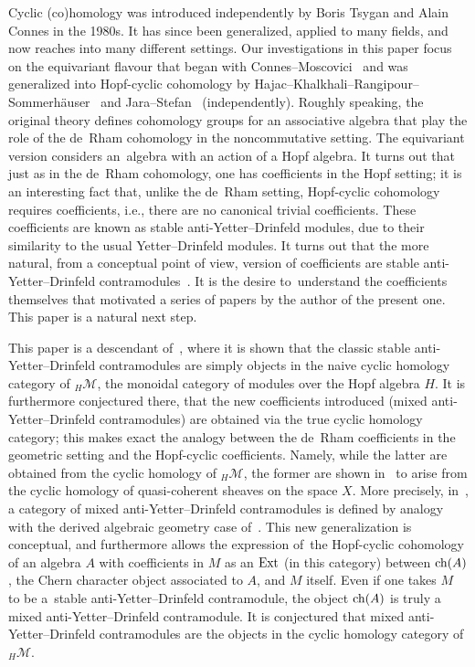 \documentclass[pdftex]{sigma}
\numberwithin{equation}{section}
\newcommand{\hmod}{{_H\mathcal{M}}}
\begin{document}
Cyclic (co)homology was introduced independently by Boris Tsygan and Alain Connes in the 1980s. It has since been generalized, applied to many fields, and now reaches into many different settings. Our investigations in this paper focus on the equivariant flavour that began with Connes--Moscovici~\cite{conmos} and was generalized into Hopf-cyclic cohomology by Hajac--Khalkhali--Rangipour--Sommerh\"{a}user~\cite{HKRS1, HKRS2} and Jara--Stefan~\cite{JS} (independently). Roughly speaking, the original theory defines cohomology groups for an associative algebra that play the role of the de~Rham cohomology in the noncommutative setting. The equivariant version considers an~alge\-bra with an action of a Hopf alge\-bra. It turns out that just as in the de~Rham cohomology, one has coefficients in the Hopf setting; it is an interesting fact that, unlike the de~Rham setting, Hopf-cyclic cohomology requires coefficients, i.e., there are no canonical trivial coefficients. These coefficients are known as stable anti-Yetter--Drinfeld modules, due to their similarity to the usual Yetter--Drinfeld modules. It turns out that the more natural, from a conceptual point of view, version of coefficients are stable anti-Yetter--Drinfeld contramodules~\cite{contra}. It is the desire to~under\-stand the coefficients themselves that motivated a series of papers by the author of the present one. This paper is a natural next step.

This paper is a descendant of~\cite{chern}, where it is shown that the classic stable anti-Yetter--Drinfeld contramodules are simply objects in the naive cyclic homology category of $\hmod$, the monoidal category of modules over the Hopf algebra $H$. It is furthermore conjectured there, that the new coefficients introduced (mixed anti-Yetter--Drinfeld contramodules) are obtained via the true cyclic homology category; this makes exact the analogy between the de~Rham coefficients in the geometric setting and the Hopf-cyclic coefficients. Namely, while the latter are obtained from the cyclic homology of $\hmod$, the former are shown in~\cite{it} to arise from the cyclic homology of quasi-coherent sheaves on the space $X$. More precisely, in~\cite{chern}, a category of mixed anti-Yetter--Drinfeld contramodules is defined by analogy with the derived algebraic geometry case of~\cite{it}. This new generalization is conceptual, and furthermore allows the expression of~the Hopf-cyclic cohomology of an algebra $A$ with coefficients in $M$ as an ${\rm Ext}$ (in this category) between $\mathop{\rm ch}(A)$, the Chern character object associated to $A$, and $M$ itself. Even if one takes $M$ to be a~stable anti-Yetter--Drinfeld contramodule, the object $\mathop{\rm ch}(A)$ is truly a mixed anti-Yetter--Drinfeld contramodule. It is conjectured that mixed anti-Yetter--Drinfeld contramodules are the objects in the cyclic homology category of $\hmod$.
\end{document}
